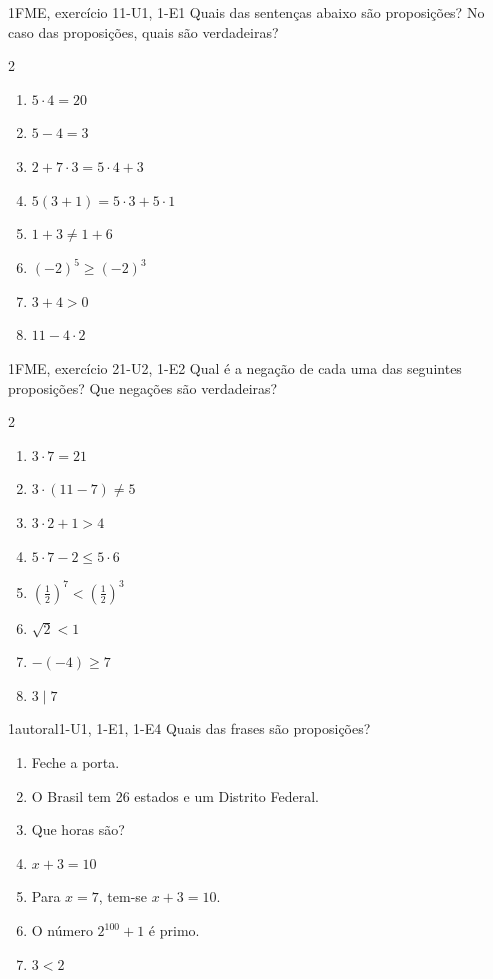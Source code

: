 \begin{questao}{1}{FME, exercício 1}{1-U1, 1-E1}\label{u1:q1}
Quais das sentenças abaixo são proposições? No caso das proposições, quais são verdadeiras?
\begin{multicols}{2}
\begin{enumerate}[label=\alph*)]
  \item $5\cdot 4=20$
  \item $5-4=3$
  \item $2+7\cdot 3=5\cdot 4+3$
  \item $5(3+1)=5\cdot 3+5\cdot 1$
  \item $1+3\neq 1+6$
  \item $(-2)^5 \ge (-2)^3$
  \item $3+4>0$
  \item $11-4\cdot 2$
\end{enumerate}
\end{multicols}
\end{questao}

\begin{questao}{1}{FME, exercício 2}{1-U2, 1-E2}\label{u1:q2}
Qual é a negação de cada uma das seguintes proposições? Que negações são verdadeiras?
\begin{multicols}{2}
\begin{enumerate}[label=\alph*)]
  \item $3\cdot 7=21$
  \item $3\cdot(11-7)\neq 5$
  \item $3\cdot 2+1>4$
  \item $5\cdot 7-2\le 5\cdot 6$
  \item $\left(\tfrac12\right)^7<\left(\tfrac12\right)^3$
  \item $\sqrt2<1$
  \item $-(-4)\ge 7$
  \item $3\mid 7$
\end{enumerate}
\end{multicols}
\end{questao}

\begin{questao}{1}{autoral}{1-U1, 1-E1, 1-E4}\label{u1:q3}
Quais das frases são proposições?
\begin{enumerate}[label=\alph*)]
  \item Feche a porta.
  \item O Brasil tem 26 estados e um Distrito Federal.
  \item Que horas são?
  \item $x+3=10$
  \item Para $x=7$, tem-se $x+3=10$.
  \item O número $2^{100}+1$ é primo.
  \item $3<2$
\end{enumerate}
\end{questao}

